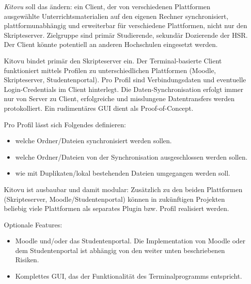 \documentclass[a4paper]{article}
\begin{document}
\emph{Kitovu} soll das ändern: ein Client, der von verschiedenen Plattformen ausgewählte Unterrichtsmaterialien auf den eigenen Rechner synchronisiert, plattformunabhängig und erweiterbar für verschiedene Plattformen, nicht nur den Skripteserver. Zielgruppe sind primär Studierende, sekundär Dozierende der HSR. Der Client könnte potentiell an anderen Hochschulen eingesetzt werden.

Kitovu bindet primär den Skripteserver ein. Der Terminal-basierte Client funktioniert mittels Profilen zu unterschiedlichen Plattformen (Moodle, Skripteserver, Studentenportal). Pro Profil sind Verbindungsdaten und eventuelle Login-Credentials im Client hinterlegt. Die Daten-Synchronisation erfolgt immer nur von Server zu Client, erfolgreiche und misslungene Datentransfers werden protokolliert. Ein rudimentäres GUI dient als Proof-of-Concept.

Pro Profil lässt sich Folgendes definieren:

\begin{itemize}
  \item welche Ordner/Dateien synchronisiert werden sollen.
  \item welche Ordner/Dateien von der Synchronisation ausgeschlossen werden sollen.
  \item wie mit Duplikaten/lokal bestehenden Dateien umgegangen werden soll.
\end{itemize}

Kitovu ist ausbaubar und damit modular: Zusätzlich zu den beiden Plattformen (Skripteserver, Moodle/Studentenportal) können in zukünftigen Projekten beliebig viele Plattformen als separates Plugin bzw. Profil realisiert werden.

Optionale Features:

\begin{itemize}
  \item Moodle und/oder das Studentenportal. Die Implementation von Moodle oder dem Studentenportal ist abhängig von den weiter unten beschriebenen Risiken.
  \item Komplettes GUI, das der Funktionalität des Terminalprogramms entspricht.
\end{itemize}
\end{document}
